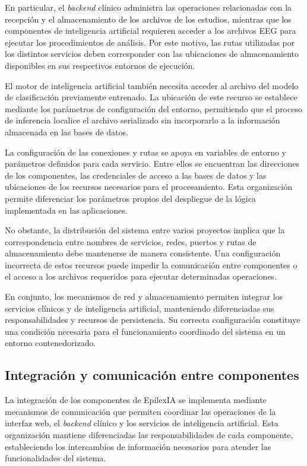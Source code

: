 En particular, el \textit{backend} clínico administra las operaciones relacionadas con la recepción y el almacenamiento de los archivos de los estudios, mientras que los componentes de inteligencia artificial requieren acceder a los archivos EEG para ejecutar los procedimientos de análisis. Por este motivo, las rutas utilizadas por los distintos servicios deben corresponder con las ubicaciones de almacenamiento disponibles en sus respectivos entornos de ejecución.


El motor de inteligencia artificial también
necesita acceder al archivo del modelo de
clasificación previamente entrenado. La ubicación
de este recurso se establece mediante los
parámetros de configuración del entorno,
permitiendo que el proceso de inferencia
localice el archivo serializado sin incorporarlo
a la información almacenada en las bases de datos.

La configuración de las conexiones y rutas
se apoya en variables de entorno y parámetros
definidos para cada servicio. Entre ellos se
encuentran las direcciones de los componentes,
las credenciales de acceso a las bases de datos
y las ubicaciones de los recursos necesarios
para el procesamiento. Esta organización permite
diferenciar los parámetros propios del despliegue
de la lógica implementada en las aplicaciones.

No obstante, la distribución del sistema entre
varios proyectos implica que la correspondencia
entre nombres de servicios, redes, puertos y
rutas de almacenamiento debe mantenerse de
manera consistente. Una configuración incorrecta
de estos recursos puede impedir la comunicación
entre componentes o el acceso a los archivos
requeridos para ejecutar determinadas operaciones.

En conjunto, los mecanismos de red y almacenamiento
permiten integrar los servicios clínicos y de
inteligencia artificial, manteniendo diferenciadas
sus responsabilidades y recursos de persistencia.
Su correcta configuración constituye una condición
necesaria para el funcionamiento coordinado del
sistema en un entorno contenedorizado.


\subsection{Integración y comunicación entre componentes}

La integración de los componentes de EpilexIA se implementa
mediante mecanismos de comunicación que permiten coordinar
las operaciones de la interfaz web, el \textit{backend} clínico y los
servicios de inteligencia artificial. Esta organización
mantiene diferenciadas las responsabilidades de cada
componente, estableciendo los intercambios de información
necesarios para atender las funcionalidades del sistema.

